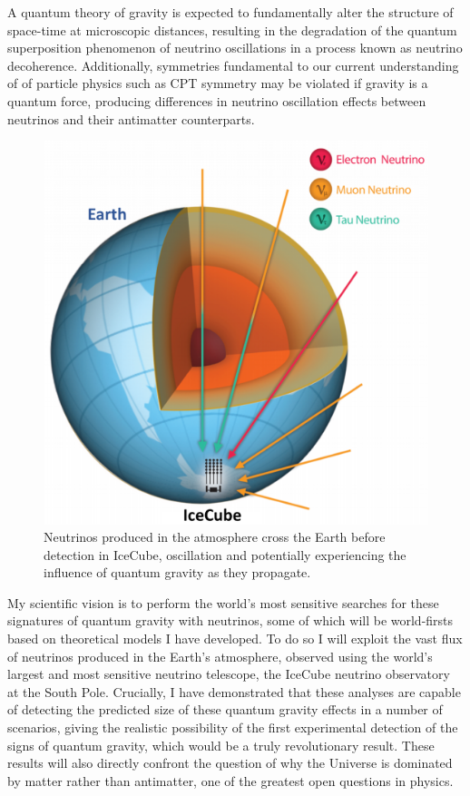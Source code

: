 \documentclass[a4paper,11pt]{article}
\begin{document}
A quantum theory of gravity is expected to fundamentally alter the structure of space-time at microscopic distances, resulting in the degradation of the quantum superposition phenomenon of neutrino oscillations in a process known as neutrino decoherence. Additionally, symmetries fundamental to our current understanding of of particle physics such as CPT symmetry may be violated if gravity is a quantum force, producing differences in neutrino oscillation effects between neutrinos and their antimatter counterparts. 

\begin{figure} %
    \centering
		\includegraphics[width=1.\linewidth]{images/atmo_osc.png}
		\caption{Neutrinos produced in the atmosphere cross the Earth before detection in IceCube, oscillation and potentially experiencing the influence of quantum gravity as they propagate.}
		\vspace{-7pt}
		\label{fig:osc}
\end{figure}

My scientific vision is to perform the world's most sensitive searches for these signatures of quantum gravity with neutrinos, some of which will be world-firsts based on theoretical models I have developed. To do so I will exploit the vast flux of neutrinos produced in the Earth's atmosphere, observed using the world's largest and most sensitive neutrino telescope, the IceCube neutrino observatory at the South Pole. Crucially, I have demonstrated that these analyses are capable of detecting the predicted size of these quantum gravity effects in a number of scenarios, giving the realistic possibility of the first experimental detection of the signs of quantum gravity, which would be a truly revolutionary result. These results will also directly confront the question of why the Universe is dominated by matter rather than antimatter, one of the greatest open questions in physics.
\end{document}

